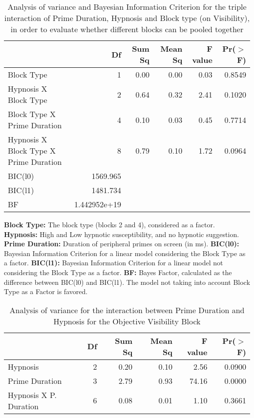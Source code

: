 \documentclass{article}
\begin{document}
\begin{table}
\caption{Analysis of variance and Bayesian Information Criterion for the triple interaction of Prime Duration, Hypnosis and Block type (on Visibility), in order to evaluate whether different blocks can be pooled together}


\centering

\begin{tabular}{lrrrrr}
  \hline
 & Df & Sum Sq & Mean Sq & F value & Pr($>$F) \\ 
  \hline
  Block Type     & 1 & 0.00 & 0.00 & 0.03 & 0.8549 \\ 
  Hypnosis X Block Type & 2 & 0.64 & 0.32 & 2.41 & 0.1020 \\ 
  Block Type X Prime Duration     & 4 & 0.10 & 0.03 & 0.45 & 0.7714 \\ 
  Hypnosis X Block Type X Prime Duration & 8 & 0.79 & 0.10 & 1.72 & 0.0964 \\ 
  BIC(l0) & 1569.965\\
  BIC(l1) & 1481.734\\
  BF & 1.442952e+19\\
   \hline
\end{tabular}

\end{table}

\textbf{Block Type:} The block type (blocks 2 and 4), considered as a factor. \textbf{Hypnosis:} High and Low hypnotic susceptibility, and no hypnotic suggestion. \textbf{Prime Duration:} Duration of peripheral primes on screen (in ms). \textbf{BIC(l0):} Bayesian Information Criterion for a linear model considering the Block Type as a factor. \textbf{BIC(l1):} Bayesian Information Criterion for a linear model not considering the Block Type as a factor. \textbf{BF:} Bayes Factor, calculated as the difference between BIC(l0) and BIC(l1). The model not taking into account Block Type as a Factor is favored.


\begin{table}
\caption{Analysis of variance for the interaction between Prime Duration and Hypnosis for the Objective Visibility Block}

\begin{tabular}{lrrrrr}
  \hline
 & Df & Sum Sq & Mean Sq & F value & Pr($>$F) \\ 
  \hline
Hypnosis       & 2 & 0.20 & 0.10 & 2.56 & 0.0900 \\ 
  Prime Duration       & 3 & 2.79 & 0.93 & 74.16 & 0.0000 \\ 
  Hypnosis X P. Duration   & 6 & 0.08 & 0.01 & 1.10 & 0.3661 \\ 
   \hline
\end{tabular}
\end{table}
\end{document}
